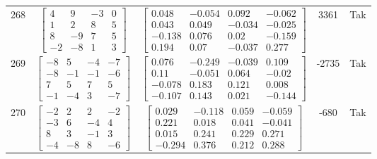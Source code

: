 \documentclass[a4paper,12pt]{article}
\begin{document}
\begin{tabular}{c c c c c}
268
&
$\begin{bmatrix} 4 & 9 & -3 & 0 \\ 1 & 2 & 8 & 5 \\ 8 & -9 & 7 & 5 \\ -2 & -8 & 1 & 3 \end{bmatrix}$
&
$\begin{bmatrix} 0.048 & -0.054 & 0.092 & -0.062 \\ 0.043 & 0.049 & -0.034 & -0.025 \\ -0.138 & 0.076 & 0.02 & -0.159 \\ 0.194 & 0.07 & -0.037 & 0.277 \end{bmatrix}$
&
3361
&
Tak
\\
269
&
$\begin{bmatrix} -8 & 5 & -4 & -7 \\ -8 & -1 & -1 & -6 \\ 7 & 5 & 7 & 5 \\ -1 & -4 & 3 & -7 \end{bmatrix}$
&
$\begin{bmatrix} 0.076 & -0.249 & -0.039 & 0.109 \\ 0.11 & -0.051 & 0.064 & -0.02 \\ -0.078 & 0.183 & 0.121 & 0.008 \\ -0.107 & 0.143 & 0.021 & -0.144 \end{bmatrix}$
&
-2735
&
Tak
\\
270
&
$\begin{bmatrix} -2 & 2 & 2 & -2 \\ -3 & 6 & -4 & 4 \\ 8 & 3 & -1 & 3 \\ -4 & -8 & 8 & -6 \end{bmatrix}$
&
$\begin{bmatrix} 0.029 & -0.118 & 0.059 & -0.059 \\ 0.221 & 0.018 & 0.041 & -0.041 \\ 0.015 & 0.241 & 0.229 & 0.271 \\ -0.294 & 0.376 & 0.212 & 0.288 \end{bmatrix}$
&
-680
&
Tak
\\
\end{tabular} \egroup \newpage
\end{document}

